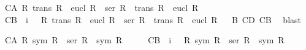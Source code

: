 \begin{isabellebody}
{}
\isamarkuptrue%
\isamarkupfalse%
\ C{}{}{\isacharunderscore}A{\isacharcolon}\ {\isachardoublequoteopen}{\isasymforall}R{\isachardot}\ trans\ R\ {\isasymand}\ eucl\ R\ {\isasymlongrightarrow}\ {\isacharparenleft}ser\ R\ {\isasymand}\ trans\ R\ {\isasymand}\ eucl\ R{\isacharparenright}{\isachardoublequoteclose}\ \isanewline
\ \isamarkupfalse%
%
\isadelimproof
\ %
\endisadelimproof
%
\isatagproof
{}\isamarkupfalse%
%
\endisatagproof
{\isafoldproof}%
%
\isadelimproof
%
\endisadelimproof
\isanewline
{}\isamarkupfalse%
\ C{}{}{\isacharunderscore}B{\isacharcolon}\ {\isachardoublequoteopen}{\isacharhash}\ i{}\ {\isasymlongrightarrow}\ {\isasymnot}\ {\isacharparenleft}{\isasymforall}R{\isachardot}\ trans\ R\ {\isasymand}\ eucl\ R\ {\isasymlongrightarrow}\ {\isacharparenleft}ser\ R\ {\isasymand}\ trans\ R\ {\isasymand}\ eucl\ R{\isacharparenright}{\isacharparenright}{\isachardoublequoteclose}\isanewline
%
\isadelimproof
\ %
\endisadelimproof
%
\isatagproof
{}\isamarkupfalse%
\ B{}\ C{}{\isacharunderscore}D\ C{}{\isacharunderscore}B\ \isamarkupfalse%
\ blast%
\endisatagproof
{\isafoldproof}%
%
\isadelimproof
%
\endisadelimproof
%
\begin{isamarkuptext}%
\begin{isbfig}{7em}
\end{isbfig}%
\end{isamarkuptext}%
\isamarkuptrue%
%
\isamarkuptrue%
\isamarkupfalse%
\ C{}{}{\isacharunderscore}A{\isacharcolon}\ {\isachardoublequoteopen}{\isasymforall}R{\isachardot}\ sym\ R\ {\isasymlongrightarrow}\ {\isacharparenleft}ser\ R\ {\isasymand}\ sym\ R{\isacharparenright}{\isachardoublequoteclose}\ \isanewline
\ \isamarkupfalse%
%
\isadelimproof
\ %
\endisadelimproof
%
\isatagproof
{}\isamarkupfalse%
%
\endisatagproof
{\isafoldproof}%
%
\isadelimproof
%
\endisadelimproof
\isanewline
{}\isamarkupfalse%
\ C{}{}{\isacharunderscore}B{\isacharcolon}\ {\isachardoublequoteopen}{\isacharhash}\ i{}\ {\isasymlongrightarrow}\ {\isasymnot}\ {\isacharparenleft}{\isasymforall}R{\isachardot}\ sym\ R\ {\isasymlongrightarrow}\ {\isacharparenleft}ser\ R\ {\isasymand}\ sym\ R{\isacharparenright}{\isacharparenright}{\isachardoublequoteclose}\ \isanewline

\end{isabellebody}
